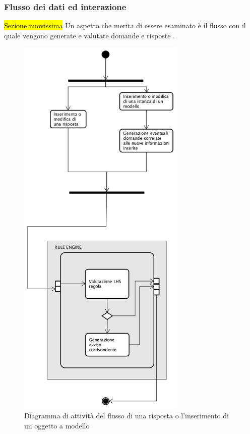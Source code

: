 \subsubsection{Flusso dei dati ed interazione}
\hl{Sezione nuovissima}
 Un aspetto che merita di essere esaminato è il flusso con il quale vengono generate e valutate domande e risposte .
\begin{figure}[H]
	\begin{center}
		\includegraphics[width=8cm]{Pics/diagramma_attivita_risposte.png}
		\caption{Diagramma di attività del flusso di una risposta o l'inserimento di un oggetto a modello}
		\label{fig:DiagrammaAttivitaRisposte}
	\end{center}
\end{figure}

